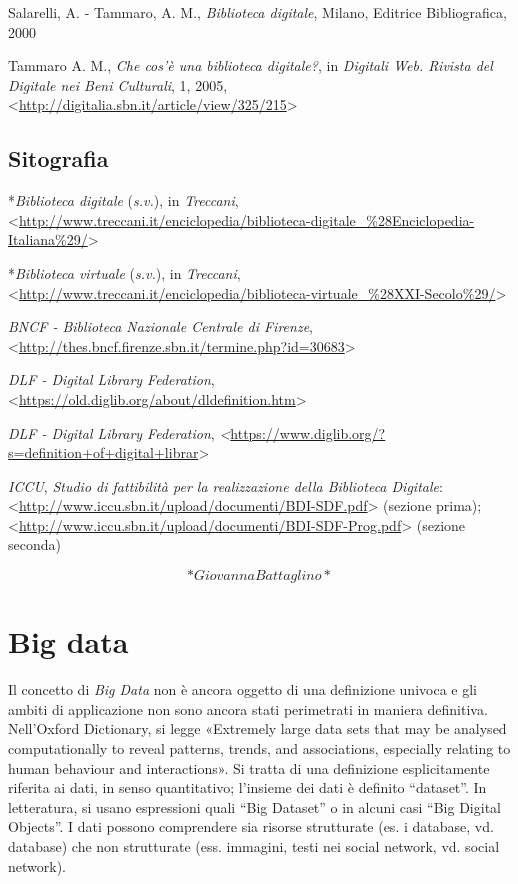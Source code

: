 \documentclass[
  b5paper,
  twoside,
  11pt,
  chapterprefix=false,
  bibliography=totocnumbered,
  listof=flat]{scrbook}
\begin{document}
Salarelli, A. - Tammaro, A. M., \emph{Biblioteca digitale}, Milano, Editrice
Bibliografica, 2000

Tammaro A. M., \emph{Che cos'è una biblioteca digitale?}, in \emph{Digitali Web.
Rivista del Digitale nei Beni Culturali}, 1, 2005,
\textless{}{\url{http://digitalia.sbn.it/article/view/325/215}\textgreater{}}

\hypertarget{sitografia-2}{%
\section*{Sitografia}\label{sitografia-2}}

*\emph{Biblioteca digitale} (\emph{s.v.}), in \emph{Treccani},
\textless{}{\href{http://www.treccani.it/enciclopedia/biblioteca-digitale_(Enciclopedia-Italiana)/}{http://www.treccani.it/enciclopedia/biblioteca-digitale\_\%28Enciclopedia-Italiana\%29/}\textgreater{}}

*\emph{Biblioteca virtuale} (\emph{s.v.}), in \emph{Treccani},
\textless{}{\href{http://www.treccani.it/enciclopedia/biblioteca-virtuale_(XXI-Secolo)/}{http://www.treccani.it/enciclopedia/biblioteca-virtuale\_\%28XXI-Secolo\%29/}\textgreater{}}

\emph{BNCF - Biblioteca Nazionale Centrale di Firenze},
\textless{}{\url{http://thes.bncf.firenze.sbn.it/termine.php?id=30683}\textgreater{}}

\emph{DLF - Digital Library Federation},
\textless{}{\url{https://old.diglib.org/about/dldefinition.htm}\textgreater{}}

\emph{DLF - Digital Library Federation},
\emph{\textless{}}{\url{https://www.diglib.org/?s=definition+of+digital+librar}\textgreater{}}

\emph{ICCU}, \emph{Studio di fattibilità per la realizzazione della Biblioteca
Digitale}:
\textless{}\href{http://www.iccu.sbn.it/upload/documenti/BDI-SDF.pdf}{{http://www.iccu.sbn.it/upload/documenti/BDI-SDF.pdf}}\textgreater{}
(sezione prima);
\textless{}{\url{http://www.iccu.sbn.it/upload/documenti/BDI-SDF-Prog.pdf}\textgreater{}}
(sezione seconda)

\[*Giovanna Battaglino*\]

\hypertarget{big-data}{%
\chapter{Big data}\label{big-data}}

Il concetto di \emph{Big Data} non è ancora oggetto di una definizione
univoca e gli ambiti di applicazione non sono ancora stati perimetrati
in maniera definitiva. Nell'Oxford Dictionary, si legge «Extremely large
data sets that may be analysed computationally to reveal patterns,
trends, and associations, especially relating to human behaviour and
interactions». Si tratta di una definizione esplicitamente riferita ai
dati, in senso quantitativo; l'insieme dei dati è definito \enquote{dataset}. In
letteratura, si usano espressioni quali \enquote{Big Dataset} o in alcuni casi
\enquote{Big Digital Objects}. I dati possono comprendere sia risorse
strutturate (es. i database, vd. database) che non strutturate (ess.
immagini, testi nei social network, vd. social network).
\end{document}
